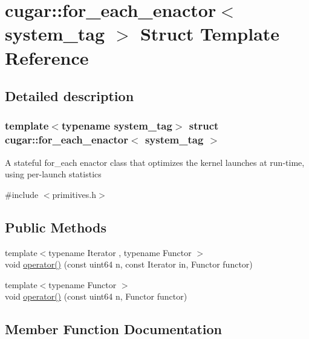 \hypertarget{structcugar_1_1for__each__enactor}{}\section{cugar\+:\+:for\+\_\+each\+\_\+enactor$<$ system\+\_\+tag $>$ Struct Template Reference}
\label{structcugar_1_1for__each__enactor}


\subsection{Detailed description}
\subsubsection*{template$<$typename system\+\_\+tag$>$\newline
struct cugar\+::for\+\_\+each\+\_\+enactor$<$ system\+\_\+tag $>$}

A stateful for\+\_\+each enactor class that optimizes the kernel launches at run-\/time, using per-\/launch statistics 

{\ttfamily \#include $<$primitives.\+h$>$}

\subsection*{Public Methods}
\begin{DoxyCompactItemize}
\item 
{\footnotesize template$<$typename Iterator , typename Functor $>$ }\\void \hyperlink{structcugar_1_1for__each__enactor_a6ab5c5317387dca99337436a1d3db8f1}{operator()} (const uint64 n, const Iterator in, Functor functor)
\item 
{\footnotesize template$<$typename Functor $>$ }\\void \hyperlink{structcugar_1_1for__each__enactor_a6b429ae818622e05dff95ec47dce9242}{operator()} (const uint64 n, Functor functor)
\end{DoxyCompactItemize}


\subsection{Member Function Documentation}
\mbox{\label{structcugar_1_1for__each__enactor_a6ab5c5317387dca99337436a1d3db8f1}} 
